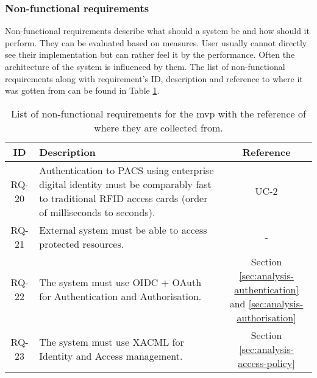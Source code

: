 \subsubsection{Non-functional requirements} \label{sec:analysis_Non-functional}
Non-functional requirements describe what should a system be and how should it perform. They can be evaluated based on measures. User usually cannot directly see their implementation but can rather feel it by the performance. Often the architecture of the system is influenced by them. The list of non-functional requirements along with requirement’s ID, description and reference to where it was gotten from can be found in Table \ref{tab:nonfunctional_requirements}.

\begin{table}[H]
    \onehalfspacing
    \centering
    \begin{tabular}{|c|p{12cm}|c|}
    \hline
    \cellcolor[HTML]{CBCEFB}\textbf{ID}&\cellcolor[HTML]{CBCEFB}\textbf{Description}&\cellcolor[HTML]{CBCEFB}\textbf{Reference}\\
    \hline
    RQ-20&Authentication to PACS using enterprise digital identity must be comparably fast to traditional RFID access cards (order of milliseconds to seconds).&UC-2\\
    \hline
    RQ-21&External system must be able to access protected resources.&-\\
    \hline
    RQ-22&The system must use OIDC + OAuth for Authentication and Authorisation.&\makecell{Section \ref{sec:analysis-authentication}\\and \ref{sec:analysis-authorisation}}\\
    \hline
    RQ-23&The system must use XACML for Identity and Access management.&Section \ref{sec:analysis-access-policy}\\
    \hline
    \end{tabular}
    \caption{List of non-functional requirements for the \acrshort{mvp} with the reference of where they are collected from.}
    \label{tab:nonfunctional_requirements}
\end{table}